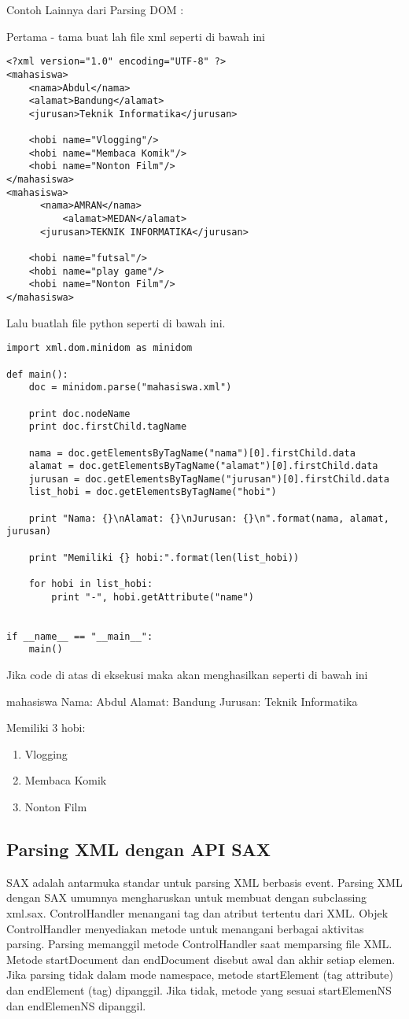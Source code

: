 Contoh Lainnya dari Parsing DOM : 

Pertama - tama buat lah file xml seperti di bawah ini
\begin{verbatim}
<?xml version="1.0" encoding="UTF-8" ?>
<mahasiswa>
    <nama>Abdul</nama>
	<alamat>Bandung</alamat>
	<jurusan>Teknik Informatika</jurusan>

	<hobi name="Vlogging"/>
	<hobi name="Membaca Komik"/>
	<hobi name="Nonton Film"/>
</mahasiswa>
<mahasiswa>
      <nama>AMRAN</nama>
          <alamat>MEDAN</alamat>
	  <jurusan>TEKNIK INFORMATIKA</jurusan>
	
	<hobi name="futsal"/>
	<hobi name="play game"/>
	<hobi name="Nonton Film"/>
</mahasiswa>
\end{verbatim}

Lalu buatlah file python seperti di bawah ini.
\begin{verbatim}
import xml.dom.minidom as minidom

def main():
    doc = minidom.parse("mahasiswa.xml")

    print doc.nodeName
    print doc.firstChild.tagName

    nama = doc.getElementsByTagName("nama")[0].firstChild.data
    alamat = doc.getElementsByTagName("alamat")[0].firstChild.data
    jurusan = doc.getElementsByTagName("jurusan")[0].firstChild.data
    list_hobi = doc.getElementsByTagName("hobi")

    print "Nama: {}\nAlamat: {}\nJurusan: {}\n".format(nama, alamat, jurusan)

    print "Memiliki {} hobi:".format(len(list_hobi))

    for hobi in list_hobi:
        print "-", hobi.getAttribute("name")


if __name__ == "__main__":
    main()
\end{verbatim}

Jika code di atas di eksekusi maka akan menghasilkan seperti di bawah ini

mahasiswa
Nama: Abdul
Alamat: Bandung
Jurusan: Teknik Informatika

Memiliki 3 hobi:
\begin{enumerate}
  \item Vlogging
  \item Membaca Komik
  \item Nonton Film
\end{enumerate}

\subsection{Parsing XML dengan API SAX}
  SAX adalah antarmuka standar untuk parsing XML berbasis event. Parsing XML dengan SAX umumnya mengharuskan untuk membuat dengan subclassing xml.sax.
  ControlHandler menangani tag dan atribut tertentu dari XML. Objek ControlHandler menyediakan metode untuk menangani berbagai aktivitas parsing. Parsing memanggil metode ControlHandler saat memparsing file XML.
  Metode startDocument dan endDocument disebut awal dan akhir setiap elemen. Jika parsing tidak dalam mode namespace, metode startElement (tag attribute) dan endElement (tag) dipanggil. Jika tidak, metode yang sesuai startElemenNS dan endElemenNS dipanggil. 

